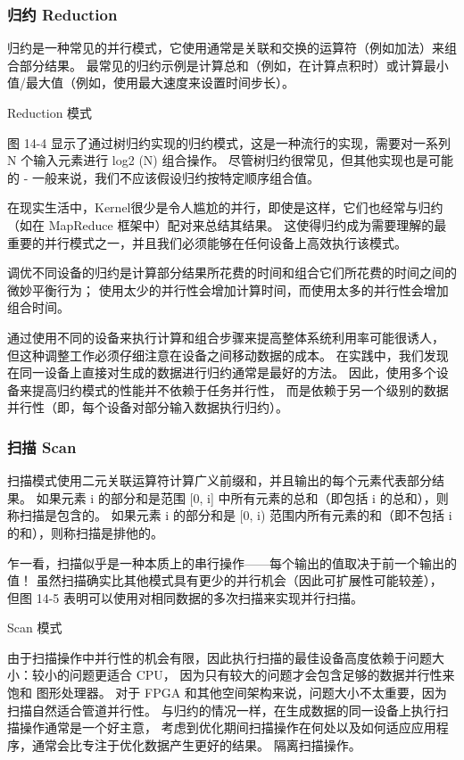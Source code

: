 \subsubsection{归约 Reduction}
归约是一种常见的并行模式，它使用通常是关联和交换的运算符（例如加法）来组合部分结果。 
最常见的归约示例是计算总和（例如，在计算点积时）或计算最小值/最大值（例如，使用最大速度来设置时间步长）。

{\color{red} Reduction 模式}

图 14-4 显示了通过树归约实现的归约模式，这是一种流行的实现，需要对一系列 N 个输入元素进行 log2 (N) 组合操作。 
尽管树归约很常见，但其他实现也是可能的 - 一般来说，我们不应该假设归约按特定顺序组合值。

在现实生活中，Kernel很少是令人尴尬的并行，即使是这样，它们也经常与归约（如在 MapReduce 框架中）配对来总结其结果。 
这使得归约成为需要理解的最重要的并行模式之一，并且我们必须能够在任何设备上高效执行该模式。

调优不同设备的归约是计算部分结果所花费的时间和组合它们所花费的时间之间的微妙平衡行为； 
使用太少的并行性会增加计算时间，而使用太多的并行性会增加组合时间。

通过使用不同的设备来执行计算和组合步骤来提高整体系统利用率可能很诱人，
但这种调整工作必须仔细注意在设备之间移动数据的成本。 
在实践中，我们发现在同一设备上直接对生成的数据进行归约通常是最好的方法。 
因此，使用多个设备来提高归约模式的性能并不依赖于任务并行性，
而是依赖于另一个级别的数据并行性（即，每个设备对部分输入数据执行归约）。

\subsubsection{扫描 Scan}
扫描模式使用二元关联运算符计算广义前缀和，并且输出的每个元素代表部分结果。 
如果元素 i 的部分和是范围 [0, i] 中所有元素的总和（即包括 i 的总和），则称扫描是包含的。 
如果元素 i 的部分和是 [0, i) 范围内所有元素的和（即不包括 i 的和），则称扫描是排他的。

乍一看，扫描似乎是一种本质上的串行操作——每个输出的值取决于前一个输出的值！ 
虽然扫描确实比其他模式具有更少的并行机会（因此可扩展性可能较差），
但图 14-5 表明可以使用对相同数据的多次扫描来实现并行扫描。

{\color{red} Scan 模式}

由于扫描操作中并行性的机会有限，因此执行扫描的最佳设备高度依赖于问题大小：较小的问题更适合 CPU，
因为只有较大的问题才会包含足够的数据并行性来饱和 图形处理器。 
对于 FPGA 和其他空间架构来说，问题大小不太重要，因为扫描自然适合管道并行性。 
与归约的情况一样，在生成数据的同一设备上执行扫描操作通常是一个好主意，
考虑到优化期间扫描操作在何处以及如何适应应用程序，通常会比专注于优化数据产生更好的结果。 隔离扫描操作。

